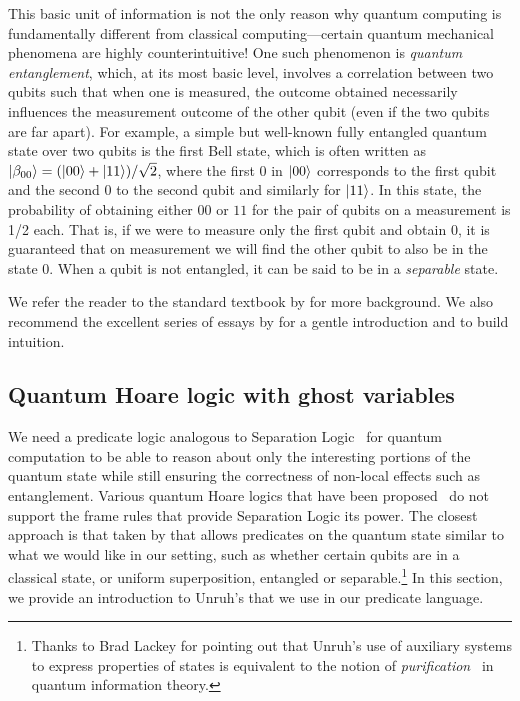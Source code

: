 This basic unit of information is not the only reason why quantum computing is fundamentally different from classical computing---certain quantum mechanical phenomena are highly counterintuitive! One such phenomenon is \textit{quantum entanglement}, which, at its most basic level, involves a correlation between two qubits such that when one is measured, the outcome obtained necessarily influences the measurement outcome of the other qubit (even if the two qubits are far apart). For example, a simple but well-known fully entangled quantum state over two qubits is the first Bell state, which is often written as $\ket{\beta_{00}} = (\ket{00}+\ket{11})/\sqrt{2}$, where the first $0$ in $\ket{00}$ corresponds to the first qubit and the second $0$ to the second qubit and similarly for $\ket{11}$. In this state, the probability of obtaining either $00$ or $11$ for the pair of qubits on a measurement is 1/2 each. That is, if we were to measure only the first qubit and obtain $0$, it is guaranteed that on measurement we will find the other qubit to also be in the state $0$. When a qubit is not entangled, it can be said to be in a \textit{separable} state.

We refer the reader to the standard textbook by \textcite{nielsen2010} for more background. We also recommend the excellent series of essays by \textcite{matuschak2019} for a gentle introduction and to build intuition.

\subsection{Quantum Hoare logic with ghost variables}

We need a predicate logic analogous to Separation Logic~\parencite{reynolds2002} for quantum computation to be able to reason about only the interesting portions of the quantum state while still ensuring the correctness of non-local effects such as entanglement. Various quantum Hoare logics that have been proposed~\parencite{aqhl2019,floydhoare2012,wpe2016} do not support the frame rules that provide Separation Logic its power. The closest approach is that taken by \textcite{unruh2019} that allows predicates on the quantum state similar to what we would like in our setting, such as whether certain qubits are in a classical state, or uniform superposition, entangled or separable.\footnote{Thanks to Brad Lackey for pointing out that Unruh's use of auxiliary systems to express properties of states is equivalent to the notion of \textit{purification}~\parencite[110]{nielsen2010} in quantum information theory.} In this section, we provide an introduction to Unruh's  that we use in our predicate language.

